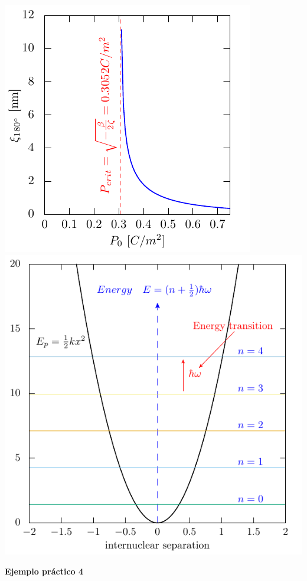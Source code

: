 \documentclass[11.5pt,a4paper]{article}
\begin{document}
\includegraphics[scale=0.90]{ejemplo7.pdf}
\includegraphics[scale=0.70]{ejemplo12.pdf} 

\textbf{Ejemplo práctico 4}
\end{document}
